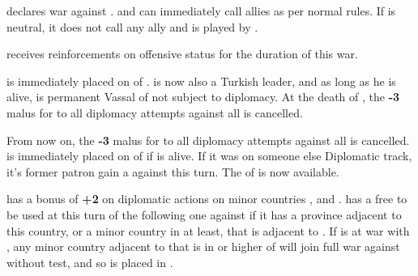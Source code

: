 


\phevnt
\aparag \paysperse declares war against \TUR.
\aparag \paysperse and \TUR can immediately call allies as per normal rules.
\aparag If \paysperse is neutral, it does not call any ally and is played by
\SPA.

\phadm
\aparag \paysperse receives reinforcements on offensive status for the
duration of this war.






\phevnt
\aparag \paysAlgerie is immediately placed on \VASSAL of \TUR.
\aparag \leaderBarbaros is now also a Turkish leader, and as long as he is
alive, \paysAlgerie is permanent Vassal of \TUR not subject to diplomacy.
\aparag At the death of \leaderBarbaros, the {\bf -3} malus for \TUR to all
diplomacy attempts against all \Barbaresques is cancelled.





\phevnt
\aparag From now on, the {\bf -3} malus for \TUR to all diplomacy attempts
against all \Barbaresques is cancelled.
\aparag \paysTunisie is immediately placed on \VASSAL of \TUR if \leaderDragut
is alive.
\bparag If it was on someone else Diplomatic track, it's former patron gain a
\CB against \paysTunisie this turn.
\aparag The \corsaire of \paysMaroc is now available.






\phdipl
\aparag \TUR has a bonus of {\bf +2} on diplomatic actions on minor countries
\paysMoldavie, \paysValachie and \paysTransylvanie.
\aparag \TUR has a free \CB to be used at this turn of the following one
against \POL if it has a province adjacent to this country, or a minor country
in \AM at least, that is adjacent to \POL.
\aparag If \TUR is at war with \POL, any minor country adjacent to \POL that
is in \AM or higher of \TUR will join full war against \POL without test, and
so is placed in \EG.

